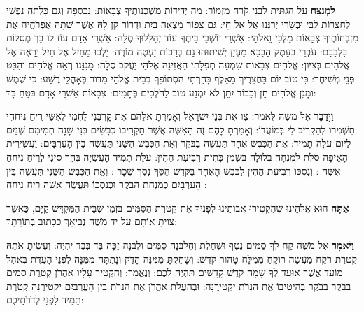 
\label{mincha}

\textbf{לַמְנַצֵּחַ} עַל הַגִּתִּית לִבְנֵי קֹרַח מִזְמוֹר: מַה יְּדִידוֹת מִשְׁכְּנוֹתֶיךָ \Shem{} צְבָאוֹת: נִכְסְפָה וְגַם כָּלְתָה נַפְשִׁי לְחַצְרוֹת \Shem{} לִבִּי וּבְשָׂרִי יְרַנְּנוּ אֶל אֵל חָי: גַּם צִפּוֹר מָצְאָה בַיִת וּדְרוֹר קֵן לָהּ אֲשֶׁר שָׁתָה אֶפְרֹחֶיהָ אֶת מִזְבְּחוֹתֶיךָ \Shem{} צְבָאוֹת מַלְכִּי וֵאלֹהָי: אַשְׁרֵי יוֹשְׁבֵי בֵיתֶךָ עוֹד יְהַלְלוּךָ סֶּלָה: אַשְׁרֵי אָדָם עוֹז לוֹ בָךְ מְסִלּוֹת בִּלְבָבָם: עֹבְרֵי בְּעֵמֶק הַבָּכָא מַעְיָן יְשִׁיתוּהוּ גַּם בְּרָכוֹת יַעְטֶה מוֹרֶה: יֵלְכוּ מֵחַיִל אֶל חָיִל יֵרָאֶה אֶל אֱלֹהִים בְּצִיּוֹן: \Shem{} אֱלֹהִים צְבָאוֹת שִׁמְעָה תְפִלָּתִי הַאֲזִינָה אֱלֹהֵי יַעֲקֹב סֶלָה: מָגִנֵּנוּ רְאֵה אֱלֹהִים וְהַבֵּט פְּנֵי מְשִׁיחֶךָ: כִּי טוֹב יוֹם בַּחֲצֵרֶיךָ מֵאָלֶף בָּחַרְתִּי הִסְתּוֹפֵף בְּבֵית אֱלֹהַי מִדּוּר בְּאָהֳלֵי רֶשַׁע: כִּי שֶׁמֶשׁ וּמָגֵן \Shem{} אֱלֹהִים חֵן וְכָבוֹד יִתֵּן \Shem{} לֹא יִמְנַע טוֹב לַהֹלְכִים בְּתָמִים: \Shem{} צְבָאוֹת אַשְׁרֵי אָדָם בֹּטֵחַ בָּךְ:

\textbf{וַיְדַבֵּר} \Shem{} אֶל מֹשֶׁה לֵּאמֹר: צַו אֶת בְּנֵי יִשְׂרָאֵל וְאָמַרְתָּ אֲלֵהֶם אֶת קָרְבָּנִי לַחְמִי לְאִשַּׁי רֵיחַ נִיחֹחִי תִּשְׁמְרוּ לְהַקְרִיב לִי בְּמוֹעֲדוֹ: וְאָמַרְתָּ לָהֶם זֶה הָאִשֶּׁה אֲשֶׁר תַּקְרִיבוּ  כְּבָשִׂים בְּנֵי שָׁנָה תְמִימִם שְׁנַיִם לַיּוֹם עֹלָה תָמִיד: אֶת הַכֶּבֶשׂ אֶחָד תַּעֲשֶׂה בַבֹּקֶר וְאֵת הַכֶּבֶשׂ הַשֵּׁנִי תַּעֲשֶׂה בֵּין הָעַרְבָּיִם: וַעֲשִׂירִית הָאֵיפָה סֹלֶת לְמִנְחָה בְּלוּלָה בְּשֶׁמֶן כָּתִית רְבִיעִת הַהִין: עֹלַת תָּמִיד הָעֲשֻׂיָה בְּהַר סִינַי לְרֵיחַ נִיחֹחַ אִשֶּׁה : וְנִסְכּוֹ רְבִיעִת הַהִין לַכֶּבֶשׂ הָאֶחָד בַּקֹּדֶשׁ הַסֵּךְ נֶסֶךְ שֵׁכָר : וְאֵת הַכֶּבֶשׂ הַשֵּׁנִי תַּעֲשֶׂה בֵּין הָעַרְבָּיִם כְּמִנְחַת הַבֹּקֶר וּכְנִסְכּוֹ תַּעֲשֶׂה אִשֵּׁה רֵיחַ נִיחֹחַ :

\textbf{אַתָּה} הוּא \Shem{} אֱלֹהֵינוּ שֶׁהִקְטִירוּ אֲבוֹתֵינוּ לְפָנֶיךָ אֶת קְטֹרֶת הַסַּמִּים בִּזְמַן שֶׁבֵּית הַמִּקְדָּשׁ קַיָּם, כַּאֲשֶׁר צִוִּיתָ אוֹתָם עַל יַד מֹשֶׁה נְבִיאָךְ כַּכָּתוּב בְּתוֹרָתָךְ:

\textbf{וַיֹּאמֶר} \Shem{} אֶל מֹשֶׁה קַח לְךָ סַמִּים נָטָף וּשְׁחֵלֶת וְחֶלְבְּנָה סַמִּים וּלְבֹנָה זַכָּה בַּד בְּבַד יִהְיֶה: וְעָשִׂיתָ אֹתָהּ קְטֹרֶת רֹקַח מַעֲשֵׂה רוֹקֵחַ מְמֻלָּח טָהוֹר קֹדֶשׁ: וְשָׁחַקְתָּ מִמֶּנָּה הָדֵק וְנָתַתָּה מִמֶּנָּה לִפְנֵי הָעֵדֻת בְּאֹהֶל מוֹעֵד אֲשֶׁר אִוָּעֵד לְךָ שָׁמָּה קֹדֶשׁ קָדָשִׁים תִּהְיֶה לָכֶם: וְנֶאֱמַר: וְהִקְטִיר עָלָיו אַהֲרֹן קְטֹרֶת סַמִּים בַּבֹּקֶר בַּבֹּקֶר בְּהֵיטִיבוֹ אֶת הַנֵּרֹת יַקְטִירֶנָּה: וּבְהַעֲלֹת אַהֲרֹן אֶת הַנֵּרֹת בֵּין הָעֲרְבַּיִם יַקְטִירֶנָּה קְטֹרֶת תָּמִיד לִפְנֵי \Shem{} לְדֹרֹתֵיכֶם:

